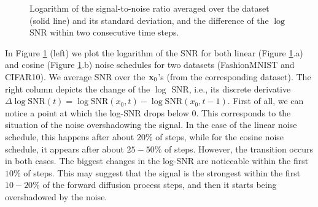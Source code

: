 \begin{figure}[h!]
	\centering
      \quad
	\caption{Logarithm of the signal-to-noise ratio averaged over the dataset (solid line) and its standard deviation, and the difference of the $\log$ SNR within two consecutive time steps.}
	\label{fig:snr_analysis}
	\vskip  -4pt
\end{figure}

In Figure \ref{fig:snr_analysis} (left) we plot the logarithm of the SNR for both linear (Figure \ref{fig:snr_analysis}.a) and cosine (Figure \ref{fig:snr_analysis}.b) noise schedules for two datasets (FashionMNIST and CIFAR10). We average SNR over the ${\mathbf{x}}_0$'s (from the corresponding dataset). The right column depicts the change of the $\log$ SNR, i.e., its discrete derivative $\Delta \log \text{SNR}(t) = \log \text{SNR}(x_0, t) - \log \text{SNR}(x_0, t-1)$. First of all, we can notice a point at which the log-SNR drops below $0$. This corresponds to the situation of the noise overshadowing the signal. In the case of the linear noise schedule, this happens after about $20\%$ of steps, while for the cosine noise schedule, it appears after about $25-50\%$ of steps. However, the transition occurs in both cases. The biggest changes in the log-SNR are noticeable within the first $10\%$ of steps. This may suggest that the signal is the strongest within the first $10-20\%$ of the forward diffusion process steps, and then it starts being overshadowed by the noise. 

